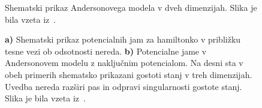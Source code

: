 \begin{minipage}[t]{0.4\textwidth}
\begin{figure}[H]
\caption{Shematski prikaz Andersonovega modela v dveh dimenzijah. Slika je bila vzeta iz~\cite{lagendijk2009fifty}.  }
\label{fig:hopping_picture} 
\end{figure}
\begin{figure}[H]
\caption{\textbf{a)} Shematski prikaz potencialnih jam za hamiltonko v približku tesne vezi ob odsotnosti nereda. \textbf{b)} Potencialne jame v Andersonovem modelu z naključnim potencialom. Na desni sta v obeh primerih shematsko prikazani gostoti stanj v treh dimenzijah. Uvedba nereda razširi pas in odpravi singularnosti gostote stanj. Slika je bila vzeta iz~\cite{mott2012electronic}.}
\label{fig:band_structure} 
\end{figure}
\end{minipage}{}
